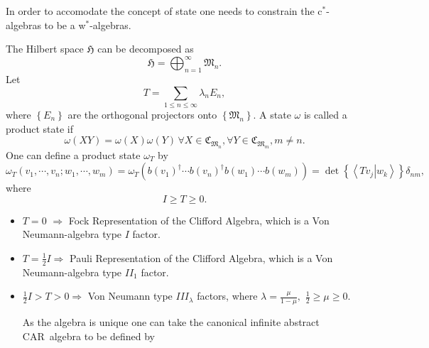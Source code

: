 \documentclass[aps,preprint]{revtex4}%
\begin{document}
In order to accomodate the concept of state one needs to constrain the
c$^{\ast}$-algebras to be a w$^{\ast}$-algebras.

The Hilbert space $\mathfrak{H}$ can be decomposed as
\begin{equation}
\mathfrak{H=}%
{\displaystyle\bigoplus_{n=1}^{\infty}}
\mathfrak{M}_{n}.
\end{equation}
Let
\begin{equation}
T=\sum_{1\leq n\leq\infty}\lambda_{n}E_{n},
\end{equation}
where $\left\{  E_{n}\right\}  $ are the orthogonal projectors onto $\left\{
\mathfrak{M}_{n}\right\}  .$ A state $\omega$ is called a product state if
\begin{equation}
\omega\left(  XY\right)  =\omega\left(  X\right)  \omega\left(  Y\right)
\,\forall X\in\mathfrak{C}_{\mathfrak{M}_{n}},\forall Y\in\mathfrak{C}%
_{\mathfrak{M}_{m}},m\neq n.
\end{equation}
One can define a product state $\omega_{T}$ by
\begin{equation}
\omega_{T}\left(  v_{1},\cdots,v_{n};w_{1},\cdots,w_{m}\right)  =\omega
_{T}\left(  b\left(  v_{1}\right)  ^{\dagger}\cdots b\left(  v_{n}\right)
^{\dagger}b\left(  w_{1}\right)  \cdots b\left(  w_{m}\right)  \right)
=\det\left\{  \left\langle \left.  Tv_{j}\right\vert w_{k}\right\rangle
\right\}  \delta_{nm},
\end{equation}
where
\begin{equation}
I\geq T\geq0.
\end{equation}


\begin{itemize}
One can then form GNS\ representations $\Pi_{T}$ corresponding to

\item $T=0$ $\Rightarrow$ Fock Representation of the Clifford Algebra, which
is a Von Neumann-algebra type $I$ factor.

\item $T=\frac{1}{2}I\Rightarrow$ Pauli Representation of the Clifford
Algebra, which is a Von Neumann-algebra type $II_{1}$ factor.

\item $\frac{1}{2}I>T>0\Rightarrow$ Von Neumann type $III_{\lambda}$ factors,
where $\lambda=\frac{\mu}{1-\mu},$ $\frac{1}{2}\geq\mu\geq0$.

As the algebra is unique one can take the canonical infinite abstract
CAR\ algebra to be defined by
\end{itemize}
\end{document}

